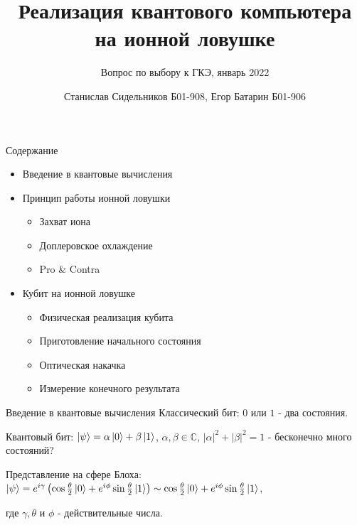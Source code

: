 \documentclass{beamer}
\title{Реализация квантового компьютера на ионной ловушке}
\subtitle{Вопрос по выбору к ГКЭ, январь 2022}
\author{Станислав Сидельников Б01-908, Егор Батарин Б01-906}
\institute{Московский физико-технический институт}
\date{}
\begin{document}
    
    \begin{frame}
        \titlepage
    \end{frame}

    \begin{frame}{Содержание}

        \begin{itemize}

            \item<1-> Введение в квантовые вычисления

      

            \item<2-> Принцип работы ионной ловушки

                \begin{itemize}
                    \item{Захват иона}
                    \item{Доплеровское охлаждение}
                    \item{Pro \& Contra}
                \end{itemize}

            \item<3-> Кубит на ионной ловушке

                \begin{itemize}


                    \item{Физическая реализация кубита}
                    \item{Приготовление начального состояния}
                    \item{Оптическая накачка}
                    \item{Измерение конечного результата}

                    
                \end{itemize}
            
            \end{itemize}

                
        \end{frame}

	\begin{frame}{Введение в квантовые вычисления}
	Классический бит: $0$ или $1$ - два состояния.
	\vspace{3mm}
	
	Квантовый бит: $\ket{\psi} = \alpha\ket{0} + \beta\ket{1}$, $\alpha,\beta \in \mathbb{C}$, $|\alpha|^2 + |\beta|^2 = 1$ - бесконечно много состояний?
	\vspace{3mm}
	
	Представление на сфере Блоха: $\ket{\psi} = e^{i\gamma}\left(  \cos{\frac{\theta}{2}}\ket{0}+e^{i\phi}\sin{\frac{\theta}{2}} \ket{1}  \right) \sim \cos{\frac{\theta}{2}}\ket{0}+e^{i\phi}\sin{\frac{\theta}{2}} \ket{1} $,
	
	где $\gamma, \theta$ и $\phi$ - действительные числа.
	\end{frame}
    
\end{document}
